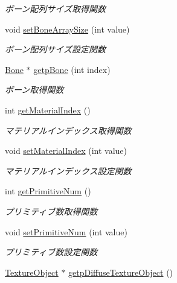 \begin{DoxyCompactItemize}
\begin{DoxyCompactList}\small\item\em ボーン配列サイズ取得関数 \end{DoxyCompactList}\item 
void \mbox{\hyperlink{class_md_bin_object_1_1_mesh_a976071846bb7161d877b9c5da59e6128}{set\+Bone\+Array\+Size}} (int value)
\begin{DoxyCompactList}\small\item\em ボーン配列サイズ設定関数 \end{DoxyCompactList}\item 
\mbox{\hyperlink{class_md_bin_object_1_1_bone}{Bone}} $\ast$ \mbox{\hyperlink{class_md_bin_object_1_1_mesh_ad7cac05848e94675d9f87c85a60aab86}{getp\+Bone}} (int index)
\begin{DoxyCompactList}\small\item\em ボーン取得関数 \end{DoxyCompactList}\item 
int \mbox{\hyperlink{class_md_bin_object_1_1_mesh_a73edae81060b25b68f5008930180e210}{get\+Material\+Index}} ()
\begin{DoxyCompactList}\small\item\em マテリアルインデックス取得関数 \end{DoxyCompactList}\item 
void \mbox{\hyperlink{class_md_bin_object_1_1_mesh_ae847facdeb6ae73eab3e8e01ac8ea011}{set\+Material\+Index}} (int value)
\begin{DoxyCompactList}\small\item\em マテリアルインデックス設定関数 \end{DoxyCompactList}\item 
int \mbox{\hyperlink{class_md_bin_object_1_1_mesh_ad97e4b5005a2522fbebb1b8d3318cd14}{get\+Primitive\+Num}} ()
\begin{DoxyCompactList}\small\item\em プリミティブ数取得関数 \end{DoxyCompactList}\item 
void \mbox{\hyperlink{class_md_bin_object_1_1_mesh_a14d0fd4cc67bf8fb5c98772bd93d2eb1}{set\+Primitive\+Num}} (int value)
\begin{DoxyCompactList}\small\item\em プリミティブ数設定関数 \end{DoxyCompactList}\item 
\mbox{\hyperlink{class_texture_object}{Texture\+Object}} $\ast$ \mbox{\hyperlink{class_md_bin_object_1_1_mesh_ae3aea9879a86c16661e7030b3cdb0b58}{getp\+Diffuse\+Texture\+Object}} ()

\end{DoxyCompactItemize}

